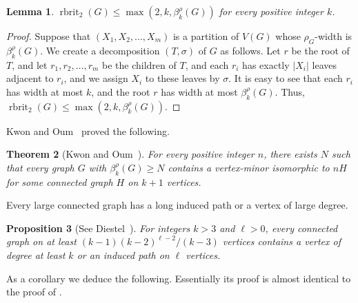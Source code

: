 \documentclass[11pt]{article}
\newtheorem{theorem}{Theorem}[section]
\newtheorem{lemma}[theorem]{Lemma}
\newtheorem{proposition}[theorem]{Proposition}
\newcommand\abs[1]{\lvert #1\rvert}
\newcommand\rkbrit{\beta^\cutrk}
\newcommand\cutrk{\rho}
\newcommand\rbrit{\operatorname{rbrit}}
\begin{document}
	
	\begin{lemma}\label{lem:rkbrit}
		$\rbrit_2(G)\le \max (2, k, \rkbrit_k(G))$ for every positive integer $k$.
	\end{lemma}
	\begin{proof}
	Suppose that $(X_1,X_2,\ldots,X_m)$ is a partition of $V(G)$ whose $\rho_G$-width is $\rkbrit_k(G)$.
	We create a decomposition $(T, \sigma)$ of $G$ as follows.
	Let $r$ be the root of $T$, and let $r_1, r_2,\ldots, r_m$ be the children of $T$, 
	and each $r_i$ has exactly $\abs{X_i}$ leaves adjacent to $r_i$, and we assign $X_i$ to these leaves by $\sigma$.
	It is easy to see that each $r_i$ has width at most $k$, and 
	the root $r$ has width at most $\rkbrit_k(G)$.
	Thus, $\rbrit_2(G)\le \max (2, k, \rkbrit_k(G))$.
	\end{proof}
	Kwon and Oum~\cite{KO2018sca} proved the following.
        \begin{theorem}[Kwon and Oum~{\cite[Theorem 1.4]{KO2018sca}}]\label{thm:scattered}
          For every positive integer $n$,
          there exists $N$ such that
          every graph $G$ with $\beta^\rho_k(G)\ge N$
          contains a vertex-minor
          isomorphic to $nH$ for some connected graph $H$ on $k+1$ vertices.
        \end{theorem}
  Every large connected graph has a long induced path or a vertex of large degree. 
  \begin{proposition}[See Diestel~{\cite[Proposition 1.3.3]{Diestel2010}}]\label{prop:diestel}
    For integers $k>3$ and $\ell>0$, every connected graph on at least $(k-1)(k-2)^{\ell-2}/(k-3)$ vertices contains a vertex of degree at least $k$ or an induced path on $\ell$ vertices.
  \end{proposition}
  As a corollary we deduce the following. 
  Essentially its proof is almost identical to the proof of \cite[Theorem 1.6]{KO2018sca}.
\end{document}
